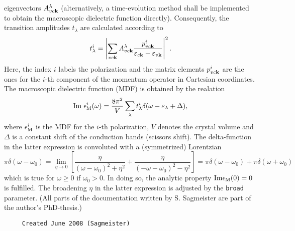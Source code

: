 \documentclass[11pt]{article}
\begin{document}
     eigenvectors $A^{\lambda}_{vc{\bf k}}$ (alternatively, a time-evolution
     method shall be implemented to obtain the macroscopic dielectric function
     directly).
     Consequently, the transition amplitudes $t_{\lambda}$ are calculated
     according to
     $$ t^{i}_{\lambda} = \left|\sum_{vc{\bf k}} A^{\lambda}_{vc{\bf k}} 
        \frac{ p^{i}_{vc{\bf k}} }{ \varepsilon_{c{\bf k}}- 
                                    \varepsilon_{v{\bf k}} } \right|^2. $$
     Here, the index $i$ labels the polarization and the matrix elements
     $p^{i}_{vc{\bf k}}$ are the ones for the $i$-th component of the momentum
     operator in Cartesian coordinates.
     The macroscopic dielectric function (MDF) is obtained by the realation
     $$ {\rm Im}\; \epsilon^{i}_{\rm M}(\omega) = \frac{8\pi^2}{V} 
                       \sum_{\lambda} t^{i}_{\lambda}
                       \delta(\omega-\varepsilon_{\lambda}+\Delta),$$
     where $\epsilon^{i}_{\rm M}$ is the MDF for the $i$-th polarization, $V$
     denotes the crystal volume and $\Delta$ is a constant shift of the
     conduction bands (scissors shift). The delta-function in the latter
     expression is convoluted with a (symmetrized) Lorentzian 
     $$ \pi\delta(\omega-\omega_0) = \lim_{\eta\rightarrow 0} \left[
                           \frac{\eta}{(\omega-\omega_0)^2+\eta^2} +
                           \frac{\eta}{(-\omega-\omega_0)^2-\eta^2} \right] =
       \pi\delta(\omega-\omega_0) +  \pi\delta(\omega+\omega_0)       $$
     which is true for $\omega \ge 0$ if $\omega_0>0$. In doing so, the analytic
     property ${\rm Im}\epsilon_{\rm M}(0)=0$ is fulfilled.
     The broadening $\eta$ in the latter expression is adjusted by the
     {\tt broad} parameter. (All parts of the documentation written by
     S. Sagmeister are part of the author's PhD-thesis.)
  
\begin{verbatim}     Created June 2008 (Sagmeister)\end{verbatim}






 
 
\mbox{}\hrulefill\ 
 
\end{document}
